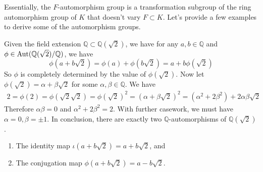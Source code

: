   Essentially, the $F$-automorphism group is a transformation subgroup of the ring automorphism group of $K$ that doesn't vary $F \subset K$. Let's provide a few examples to derive some of the automorphism groups. 

  \begin{example}
    Given the field extension $\mathbb{Q} \subset \mathbb{Q}(\sqrt{2})$, we have for any $a, b \in \mathbb{Q}$ and $\phi \in \Aut(\mathbb{Q}(\sqrt{2})/\mathbb{Q})$, we have 
    \begin{equation}
      \phi(a + b \sqrt{2}) = \phi(a) + \phi(b \sqrt{2}) = a + b \phi(\sqrt{2}) 
    \end{equation}
    So $\phi$ is completely determined by the value of $\phi(\sqrt{2})$. Now let $\phi(\sqrt{2}) = \alpha + \beta \sqrt{2}$ for some $\alpha, \beta \in \mathbb{Q}$. We have 
    \begin{align}
      2 = \phi(2) = \phi(\sqrt{2} \sqrt{2}) = \phi(\sqrt{2})^2 = (\alpha + \beta\sqrt{2})^2 = (\alpha^2 + 2 \beta^2) + 2 \alpha \beta \sqrt{2} 
    \end{align}
    Therefore $\alpha \beta = 0$ and $\alpha^2 + 2 \beta^2 = 2$. With further casework, we must have $\alpha = 0, \beta = \pm 1$. In conclusion, there are exactly two $\mathbb{Q}$-automorphisms of $\mathbb{Q}(\sqrt{2})$. 
    \begin{enumerate}
      \item The identity map $\iota(a + b \sqrt{2}) = a + b \sqrt{2}$, and 
      \item The conjugation map $\phi(a + b \sqrt{2}) = a - b \sqrt{2}$. 
    \end{enumerate}
  \end{example}


